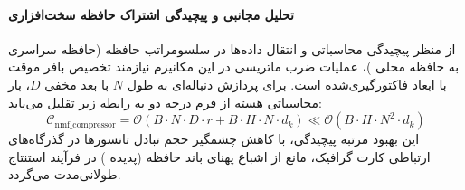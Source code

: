 \paragraph{تحلیل مجانبی و پیچیدگی اشتراک حافظه سخت‌افزاری}
از منظر پیچیدگی محاسباتی و انتقال داده‌ها در سلسومراتب حافظه (حافظه سراسری  به حافظه محلی )، عملیات ضرب ماتریسی در این مکانیزم نیازمند تخصیص بافر موقت با ابعاد فاکتورگیری‌شده است. برای پردازش دنباله‌ای به طول $N$ با بعد مخفی $D$، بار محاسباتی هسته از فرم درجه دو به رابطه زیر تقلیل می‌یابد:
\begin{equation}
\label{eq:complexity_nmf_compressor}
\mathcal{C}_{\text{nmf\_compressor}} = \mathcal{O}\left( B \cdot N \cdot D \cdot r + B \cdot H \cdot N \cdot d_k \right) \ll \mathcal{O}\left( B \cdot H \cdot N^2 \cdot d_k \right)
\end{equation}
این بهبود مرتبه پیچیدگی، با کاهش چشمگیر حجم تبادل تانسورها در گذرگاه‌های ارتباطی کارت گرافیک، مانع از اشباع پهنای باند حافظه (پدیده ) در فرآیند استنتاج طولانی‌مدت می‌گردد.

